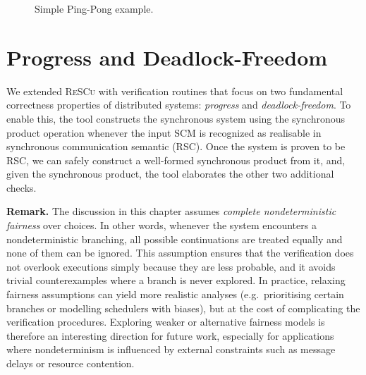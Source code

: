 \begin{example}
\begin{figure}[!ht]
\caption{Simple Ping-Pong example.}
\label{fig:ping}
\end{figure}

\end{example}

\section{Progress and Deadlock-Freedom}
We extended \textsc{ReSCu} with verification routines that focus on two
fundamental correctness properties of distributed systems: \emph{progress} and
\emph{deadlock-freedom}. To enable this, the tool constructs the synchronous
system using the synchronous product operation whenever the input SCM is recognized 
as realisable in synchronous communication semantic (RSC). 
Once the system is proven to be RSC, we can safely construct a 
well-formed synchronous product from it, and, given the synchronous product, 
the tool elaborates the other two additional checks.

\textbf{Remark.} 
The discussion in this chapter assumes \emph{complete nondeterministic 
fairness} over choices. In other words, whenever the system encounters 
a nondeterministic branching, all possible continuations are treated 
equally and none of them can be ignored. This assumption ensures that the 
verification does not overlook executions simply because they are less 
probable, and it avoids trivial counterexamples where a branch is never 
explored. In practice, relaxing fairness assumptions can yield more 
realistic analyses (e.g.\ prioritising certain branches or modelling 
schedulers with biases), but at the cost of complicating the 
verification procedures. Exploring weaker or alternative fairness models 
is therefore an interesting direction for future work, especially for 
applications where nondeterminism is influenced by external constraints 
such as message delays or resource contention.

